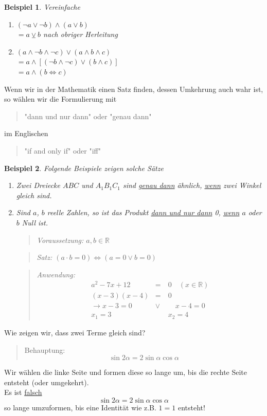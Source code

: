 \documentclass{report}
\newtheorem{myexample}{Beispiel}
\begin{document}
\begin{myexample}Vereinfache
\begin{enumerate}
\item $(\lnot a \lor \lnot b) \land (a \lor b)$\\
$=a \veebar b$ nach obriger Herleitung
\item $(a \land \lnot b \land \lnot c) \lor (a \land b \land c)$\\
$= a \land [(\lnot b \land \lnot c) \lor (b \land c)]$\\
$= a \land (b \iff c)$
\end{enumerate}
\end{myexample}
Wenn wir in der Mathematik einen Satz finden, dessen Umkehrung auch wahr ist, so wählen wir die Formulierung mit
\begin{quote}"dann und nur dann" oder "genau dann"\end{quote}
im Englischen
\begin{quote}"if and only if" oder "iff"\end{quote}
\begin{myexample}Folgende Beispiele zeigen solche Sätze
\begin{enumerate}
\item Zwei Dreiecke $ABC$ und $A_1B_1C_1$ sind \underline{genau dann} ähnlich, \underline{wenn} zwei Winkel gleich sind.
\item Sind $a$, $b$ reelle Zahlen, so ist das Produkt \underline{dann und nur dann} 0, \underline{wenn} $a$ oder $b$ Null ist.
\begin{quote}{Voraussetzung}: $a, b \in \mathbb{R}$\end{quote}
\begin{quote}{Satz}: $(a \cdot b = 0) \iff (a = 0 \lor b = 0)$\end{quote}
\begin{quote}{Anwendung}:\begin{eqnarray}a^2 - 7x + 12 &=& 0\quad(x \in \mathbb{R}) \nonumber \\
(x-3)(x-4)&=&0 \nonumber \\
\to x-3=0 \quad &\lor& \quad x-4=0 \nonumber \\
x_1 = 3 &\quad& x_2 = 4\end{eqnarray}\end{quote}
\end{enumerate}
\end{myexample}
Wie zeigen wir, dass zwei Terme gleich sind?
\begin{quote}{Behauptung}: \begin{equation}\sin{2\alpha} = 2\sin{\alpha}\cos{\alpha}\end{equation} \end{quote}
Wir wählen die linke Seite und formen diese so lange um, bis die rechte Seite entsteht (oder umgekehrt).\\Es ist \underline{falsch}
\begin{equation}\sin{2\alpha} = 2\sin{\alpha}\cos{\alpha}\end{equation}
so lange umzuformen, bis eine Identität wie z.B. $1 = 1$ entsteht!
\end{document}
